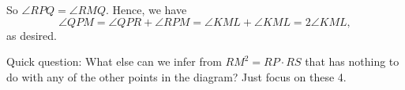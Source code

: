 






So $\angle RPQ = \angle RMQ$. Hence, we have $$ \angle QPM = \angle QPR + \angle RPM = \angle KML + \angle KML = 2 \angle KML, $$as desired.

Quick question: What else can we infer from $RM^2 = RP \cdot RS$ that has nothing to do with any of the other points in the diagram?  Just focus on these 4.











